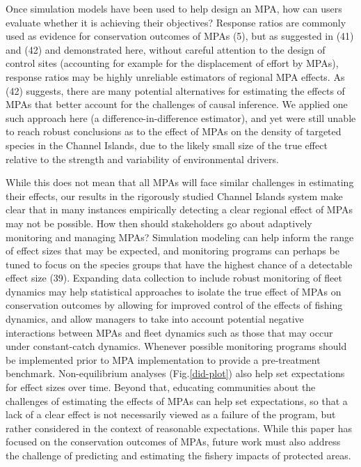 \documentclass[9pt,twocolumn,twoside,lineno]{pnas-new}
\begin{document}
Once simulation models have been used to help design an MPA, how can
users evaluate whether it is achieving their objectives? Response ratios
are commonly used as evidence for conservation outcomes of MPAs (5), but
as suggested in (41) and (42) and demonstrated here, without careful
attention to the design of control sites (accounting for example for the
displacement of effort by MPAs), response ratios may be highly
unreliable estimators of regional MPA effects. As (42) suggests, there
are many potential alternatives for estimating the effects of MPAs that
better account for the challenges of causal inference. We applied one
such approach here (a difference-in-difference estimator), and yet were
still unable to reach robust conclusions as to the effect of MPAs on the
density of targeted species in the Channel Islands, due to the likely
small size of the true effect relative to the strength and variability
of environmental drivers.

While this does not mean that all MPAs will face similar challenges in
estimating their effects, our results in the rigorously studied Channel
Islands system make clear that in many instances empirically detecting a
clear regional effect of MPAs may not be possible. How then should
stakeholders go about adaptively monitoring and managing MPAs?
Simulation modeling can help inform the range of effect sizes that may
be expected, and monitoring programs can perhaps be tuned to focus on
the species groups that have the highest chance of a detectable effect
size (39). Expanding data collection to include robust monitoring of
fleet dynamics may help statistical approaches to isolate the true
effect of MPAs on conservation outcomes by allowing for improved control
of the effects of fishing dynamics, and allow managers to take into
account potential negative interactions between MPAs and fleet dynamics
such as those that may occur under constant-catch dynamics. Whenever
possible monitoring programs should be implemented prior to MPA
implementation to provide a pre-treatment benchmark. Non-equilibrium
analyses (Fig.\ref{did-plot}) also help set expectations for effect
sizes over time. Beyond that, educating communities about the challenges
of estimating the effects of MPAs can help set expectations, so that a
lack of a clear effect is not necessarily viewed as a failure of the
program, but rather considered in the context of reasonable
expectations. While this paper has focused on the conservation outcomes
of MPAs, future work must also address the challenge of predicting and
estimating the fishery impacts of protected areas.
\end{document}
